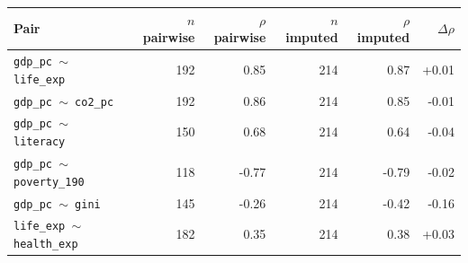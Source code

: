 \small
\begin{tabular}{lrrrrr}
\toprule
Pair & $n$ pairwise & $\rho$ pairwise & $n$ imputed & $\rho$ imputed & $\Delta\rho$ \\
\midrule
\texttt{gdp\_pc $\sim$ life\_exp} & 192 & 0.85 & 214 & 0.87 & +0.01 \\
\texttt{gdp\_pc $\sim$ co2\_pc} & 192 & 0.86 & 214 & 0.85 & -0.01 \\
\texttt{gdp\_pc $\sim$ literacy} & 150 & 0.68 & 214 & 0.64 & -0.04 \\
\texttt{gdp\_pc $\sim$ poverty\_190} & 118 & -0.77 & 214 & -0.79 & -0.02 \\
\texttt{gdp\_pc $\sim$ gini} & 145 & -0.26 & 214 & -0.42 & -0.16 \\
\texttt{life\_exp $\sim$ health\_exp} & 182 & 0.35 & 214 & 0.38 & +0.03 \\
\bottomrule
\end{tabular}
